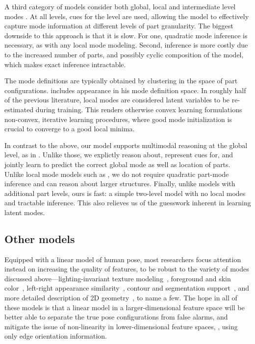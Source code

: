 A third category of models consider both global, local and intermediate level 
modes \citep{wang2011,sun2011,batra2012,tianexploring}.  At all levels, cues 
for the level are used, allowing the model to effectively capture mode 
information at different levels of part granularity.  The biggest downside to 
this approach is that it is slow.  For one, quadratic mode inference is 
necessary, as with any local mode modeling.  Second, inference is more costly 
due to the increased number of parts, and possibly cyclic composition of the 
model, which makes exact inference intractable.

The mode definitions are typically obtained by clustering in the space of part 
configurations.  \citet{everingham2011} includes appearance in his mode 
definition space.  In roughly half of the previous literature, local modes are 
considered latent variables to be re-estimated during training.  This renders 
otherwise convex learning formulations non-convex, iterative learning 
procedures, where good mode initialization is crucial to converge to a good 
local minima.


In contrast to the above, our model supports multimodal reasoning at the global 
level, as in \citep{everingham2011,ramanan-faces,wang2008multiple}.  Unlike 
those, we explictly reason about, represent cues for, and jointly learn to 
predict the correct global mode as well as location of parts.  Unlike local 
mode models such as \citet{deva2011}, we do not require quadratic part-mode 
inference and can reason about larger structures.  Finally, unlike models with 
additional part levels, ours is fast: a simple two-level model with no local 
modes and tractable inference.  This also relieves us of the guesswork inherent 
in learning latent modes. 

\subsection{Other models}
 Equipped with a linear model of human 
pose, most researchers focus attention instead on increasing the quality of 
features, to be robust to the variety of modes discussed 
above---lighting-invariant texture modeling~\citep{andriluka09}, foreground and 
skin color~\citep{devacrf,eichner09}, left-right appearance 
similarity~\citep{ddtran,sapp2011}, contour and segmentation 
support~\citep{sapp2010cascades,sapp2011}, and more detailed description of 2D 
geometry~\citep{ddtran,sapp2011}, to name a few.  The hope in all of these 
models is that a linear model in a larger-dimensional feature space will be 
better able to separate the true pose configurations from false alarms, and 
mitigate the issue of non-linearity in lower-dimensional feature spaces, \eg, 
using only edge orientation information.


